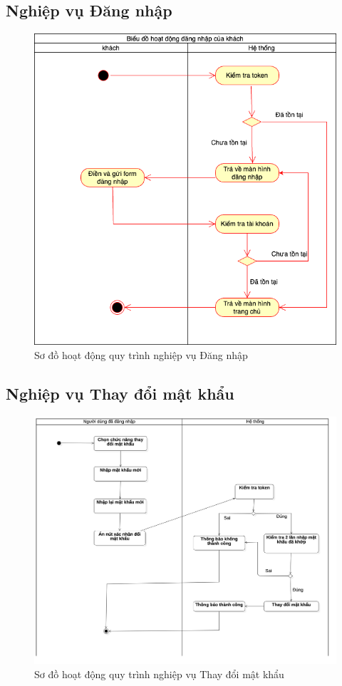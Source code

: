 \documentclass[../DoAn.tex]{subfiles}
\begin{document}
\subsection{Nghiệp vụ Đăng nhập}
\begin{figure}[H]
   \centering
    \includegraphics[width=1\linewidth]{Hinhve/Activity/dang_nhap.png}
    \caption{Sơ đồ hoạt động quy trình nghiệp vụ Đăng nhập}
    \label{fig:dang_nhap}
\end{figure}
\hfill

\subsection{Nghiệp vụ Thay đổi mật khẩu}
\begin{figure}[H]
   \centering
    \includegraphics[width=1\linewidth]{Hinhve/Activity/Activity_Thay_Doi_Mat_Khau.png}
    \caption{Sơ đồ hoạt động quy trình nghiệp vụ Thay đổi mật khẩu}
    \label{fig:dang_nhap}
\end{figure}
\hfill
\end{document}
